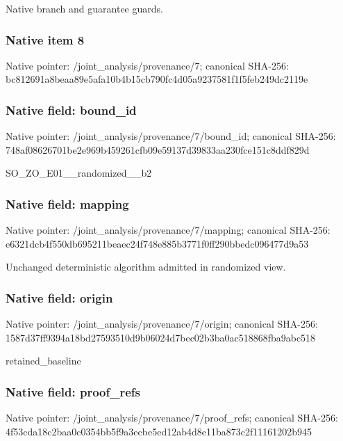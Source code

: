 \documentclass[10pt,a4paper]{article}
\begin{document}
\begingroup\raggedright\sloppy Native branch and guarantee guards.\par\endgroup

\subsubsection{Native item 8}
Native pointer: /joint\_\allowbreak{}analysis/provenance/7; canonical SHA-256: bc812691a8beaa89e5afa10b4b15cb790fc4d05a9237581f1f5feb249dc2119e

\subsubsection{Native field: bound\_\allowbreak{}id}
Native pointer: /joint\_\allowbreak{}analysis/provenance/7/bound\_\allowbreak{}id; canonical SHA-256: 748af08626701be2e969b459261cfb09e59137d39833aa230fce151c8ddf829d

\begingroup\raggedright\sloppy SO\_\allowbreak{}ZO\_\allowbreak{}E01\_\allowbreak{}\_\allowbreak{}randomized\_\allowbreak{}\_\allowbreak{}b2\par\endgroup

\subsubsection{Native field: mapping}
Native pointer: /joint\_\allowbreak{}analysis/provenance/7/mapping; canonical SHA-256: e6321dcb4f550db695211beaec24f748e885b3771f0ff290bbedc096477d9a53

\begingroup\raggedright\sloppy Unchanged deterministic algorithm admitted in randomized view.\par\endgroup

\subsubsection{Native field: origin}
Native pointer: /joint\_\allowbreak{}analysis/provenance/7/origin; canonical SHA-256: 1587d37ff9394a18bd27593510d9b06024d7bec02b3ba0ac518868fba9abc518

\begingroup\raggedright\sloppy retained\_\allowbreak{}baseline\par\endgroup

\subsubsection{Native field: proof\_\allowbreak{}refs}
Native pointer: /joint\_\allowbreak{}analysis/provenance/7/proof\_\allowbreak{}refs; canonical SHA-256: 4f53cda18c2baa0c0354bb5f9a3ecbe5ed12ab4d8e11ba873c2f11161202b945
\end{document}
